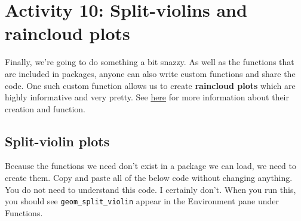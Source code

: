 \documentclass[]{book}
\begin{document}
\hypertarget{activity-10-split-violins-and-raincloud-plots}{%
\section{Activity 10: Split-violins and raincloud plots}\label{activity-10-split-violins-and-raincloud-plots}}

Finally, we're going to do something a bit snazzy. As well as the functions that are included in packages, anyone can also write custom functions and share the code. One such custom function allows us to create \textbf{raincloud plots} which are highly informative and very pretty. See \href{https://wellcomeopenresearch.org/articles/4-63}{here} for more information about their creation and function.

\hypertarget{split-violin-plots}{%
\subsection{Split-violin plots}\label{split-violin-plots}}

Because the functions we need don't exist in a package we can load, we need to create them. Copy and paste all of the below code without changing anything. You do not need to understand this code. I certainly don't. When you run this, you should see \texttt{geom\_split\_violin} appear in the Environment pane under Functions.
\end{document}
